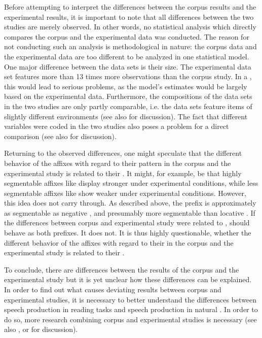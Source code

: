 Before attempting to interpret the differences between the corpus results and the experimental results, it is important to note that all differences between the two studies are merely observed. In other words, no statistical analysis which directly compares the corpus and the experimental data was conducted. The reason for not conducting such an analysis is methodological in nature: the corpus data and the experimental data are too different to be analyzed in one statistical model. 
One major difference between the data sets is their size. The experimental data set features more than 13 times more observations than the corpus study. In a , this would lead to serious problems, as the model's estimates would be largely based on the experimental data.
 Furthermore, the compositions of the data sets in the two studies are only partly comparable, i.e. the data sets feature items of slightly different environments (see also  for discussion). The fact that different variables were coded in the two studies also poses a problem for a direct comparison (see also  for discussion).

Returning to the observed differences, one might speculate that the different behavior of the affixes with regard to their  pattern in the corpus and the experimental study is related to their . It might, for example, be that highly segmentable affixes like  display stronger  under experimental conditions, while less segmentable affixes like  show weaker  under experimental conditions. However, this idea does not carry through. As described above, the prefix  is approximately as segmentable as negative , and presumably more segmentable than locative . If the differences between corpus and experimental study were related to ,  should behave as both prefixes. It does not. %
It is thus highly questionable, whether the different behavior of the affixes with regard to their  in the corpus and the experimental study is related to their .

To conclude, there are differences between the results of the corpus and the experimental study but it is yet unclear how these differences can be explained. In order to find out what causes deviating results between corpus and experimental studies, it is necessary to better understand the differences between speech production in reading tasks and speech production in natural . In order to do so, more research combining corpus and experimental studies is necessary (see also , or \cite{Arppe.2007} for discussion). 





